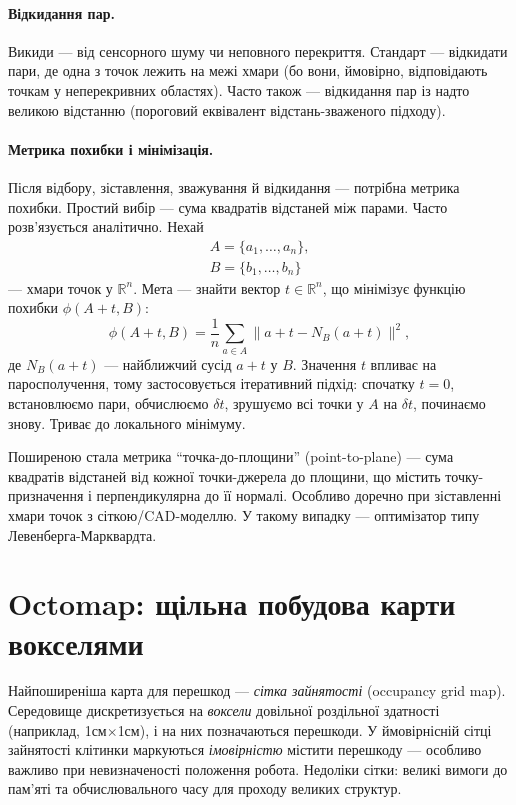 \paragraph{Відкидання пар.}
Викиди — від сенсорного шуму чи неповного перекриття. Стандарт — відкидати пари, де одна з точок лежить на межі хмари (бо вони, ймовірно, відповідають точкам у неперекривних областях). Часто також — відкидання пар із надто великою відстанню (пороговий еквівалент відстань-зваженого підходу).

\paragraph{Метрика похибки і мінімізація.}
Після відбору, зіставлення, зважування й відкидання — потрібна метрика похибки. Простий вибір — сума квадратів відстаней між парами. Часто розв'язується аналітично. Нехай
\begin{eqnarray}
A=\{a_1,\ldots,a_n\},\\
B=\{b_1,\dots,b_n\}
\end{eqnarray}
— хмари точок у $\mathbb{R}^n$. Мета — знайти вектор $t \in \mathbb{R}^n$, що мінімізує функцію похибки $\phi(A+t,B)$:
\begin{equation}
\phi(A+t,B) = \frac{1}{n} \sum_{a \in A} \|a + t - N_B(a + t)\|^2,
\end{equation}
де $N_B(a+t)$ — найближчий сусід $a+t$ у $B$. Значення $t$ впливає на паросполучення, тому застосовується ітеративний підхід: спочатку $t=0$, встановлюємо пари, обчислюємо $\delta t$, зрушуємо всі точки у $A$ на $\delta t$, починаємо знову. Триває до локального мінімуму.

Поширеною стала метрика ``точка-до-площини'' (point-to-plane) — сума квадратів відстаней від кожної точки-джерела до площини, що містить точку-призначення і перпендикулярна до її нормалі. Особливо доречно при зіставленні хмари точок з сіткою/CAD-моделлю. У такому випадку — оптимізатор типу Левенберга-Марквардта.

\section{Octomap: щільна побудова карти вокселями}
Найпоширеніша карта для перешкод — \emph{сітка зайнятості} (occupancy grid map). Середовище дискретизується на \emph{воксели} довільної роздільної здатності (наприклад, 1см$\times$1см), і на них позначаються перешкоди. У ймовірнісній сітці зайнятості клітинки маркуються \emph{імовірністю} містити перешкоду — особливо важливо при невизначеності положення робота. Недоліки сітки: великі вимоги до пам'яті та обчислювального часу для проходу великих структур.

